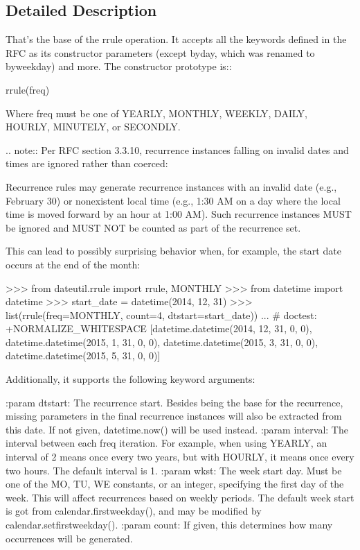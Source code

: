 \subsection{Detailed Description}
\begin{DoxyVerb}That's the base of the rrule operation. It accepts all the keywords
defined in the RFC as its constructor parameters (except byday,
which was renamed to byweekday) and more. The constructor prototype is::

        rrule(freq)

Where freq must be one of YEARLY, MONTHLY, WEEKLY, DAILY, HOURLY, MINUTELY,
or SECONDLY.

.. note::
    Per RFC section 3.3.10, recurrence instances falling on invalid dates
    and times are ignored rather than coerced:

        Recurrence rules may generate recurrence instances with an invalid
        date (e.g., February 30) or nonexistent local time (e.g., 1:30 AM
        on a day where the local time is moved forward by an hour at 1:00
        AM).  Such recurrence instances MUST be ignored and MUST NOT be
        counted as part of the recurrence set.

    This can lead to possibly surprising behavior when, for example, the
    start date occurs at the end of the month:

    >>> from dateutil.rrule import rrule, MONTHLY
    >>> from datetime import datetime
    >>> start_date = datetime(2014, 12, 31)
    >>> list(rrule(freq=MONTHLY, count=4, dtstart=start_date))
    ... # doctest: +NORMALIZE_WHITESPACE
    [datetime.datetime(2014, 12, 31, 0, 0),
     datetime.datetime(2015, 1, 31, 0, 0),
     datetime.datetime(2015, 3, 31, 0, 0),
     datetime.datetime(2015, 5, 31, 0, 0)]

Additionally, it supports the following keyword arguments:

:param dtstart:
    The recurrence start. Besides being the base for the recurrence,
    missing parameters in the final recurrence instances will also be
    extracted from this date. If not given, datetime.now() will be used
    instead.
:param interval:
    The interval between each freq iteration. For example, when using
    YEARLY, an interval of 2 means once every two years, but with HOURLY,
    it means once every two hours. The default interval is 1.
:param wkst:
    The week start day. Must be one of the MO, TU, WE constants, or an
    integer, specifying the first day of the week. This will affect
    recurrences based on weekly periods. The default week start is got
    from calendar.firstweekday(), and may be modified by
    calendar.setfirstweekday().
:param count:
    If given, this determines how many occurrences will be generated.


\end{DoxyVerb}
